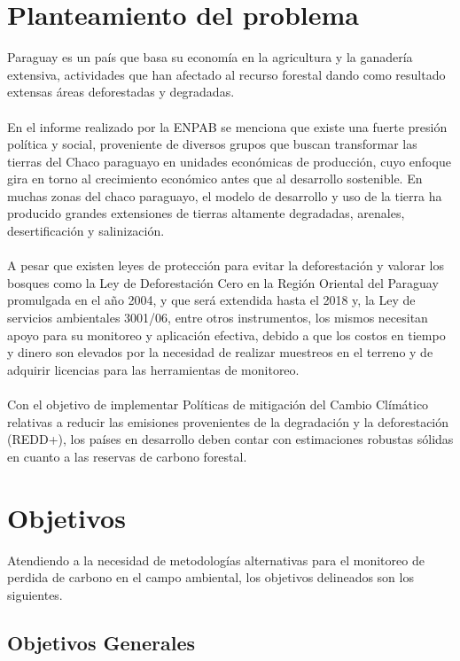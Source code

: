 \section{Planteamiento del problema}

Paraguay es un pa\'is que basa su econom\'ia en la agricultura y la ganader\'ia extensiva, actividades que han afectado al recurso forestal dando como resultado extensas \'areas deforestadas y degradadas.\\~\\
	En el informe realizado por la ENPAB \cite{basualdo2003estrategia} se menciona que existe una fuerte presi\'on pol\'itica y social, proveniente de diversos grupos que buscan transformar las tierras del Chaco paraguayo en unidades econ\'omicas de producci\'on, cuyo enfoque gira en torno al crecimiento econ\'omico antes que al desarrollo sostenible. 
	En muchas zonas del chaco paraguayo, el modelo de desarrollo y uso de la tierra ha producido grandes extensiones de tierras altamente degradadas, arenales, desertificaci\'on y salinizaci\'on.\\~\\	
	A pesar que existen leyes de protecci\'on para evitar la deforestaci\'on y valorar los bosques como la Ley de Deforestaci\'on Cero en la Regi\'on Oriental del Paraguay promulgada en el a\~{n}o 2004, y que ser\'a extendida hasta el 2018 y, la Ley de servicios ambientales 3001/06, entre otros instrumentos, los mismos necesitan apoyo para su monitoreo y aplicaci\'on efectiva, debido a que los costos en tiempo y dinero son elevados por la necesidad de realizar muestreos en el terreno y de adquirir licencias para las herramientas de monitoreo.\\~\\
	Con el objetivo de implementar Pol\'iticas de mitigaci\'on del Cambio Cl\'im\'atico relativas a reducir las emisiones provenientes de la degradaci\'on y la deforestaci\'on (REDD+), los pa\'ises en desarrollo deben contar con estimaciones robustas s\'olidas en cuanto a las reservas de carbono forestal\cite{BAAPA2013}.

\section{Objetivos}
Atendiendo a la necesidad de metodolog\'ias alternativas para el monitoreo de perdida de carbono en el campo ambiental, los objetivos delineados son los siguientes.

\subsection{Objetivos Generales}


